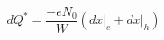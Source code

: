 \documentclass[../main.tex]{subfiles}%
\begin{document}
%
    \Xequation%
    \begin{equation}%
        dQ^{*} =%
        \dfrac{-eN_{0}}{W}%
        \left(%
            dx \bigg|_{e}%
            +%
            dx \bigg|_{h}%
        \right)%
        \label{eq:charge-induction-rate}%
    \end{equation}%
\end{document}
